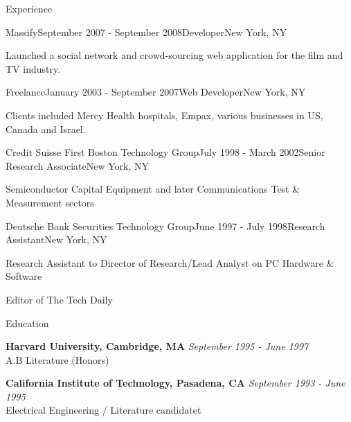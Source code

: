 \documentclass{resume} %
\begin{document}
\begin{rSection}{Experience}

\begin{rSubsection}{Massify}{September 2007 - September 2008}{Developer}{New York, NY}
\item Launched a social network and crowd-sourcing web application for the film and TV industry.
\end{rSubsection}


\begin{rSubsection}{Freelance}{January 2003 - September 2007}{Web Developer}{New York, NY}
\item Clients included Mercy Health hospitals, Empax, various businesses in US, Canada and Israel.
\end{rSubsection}


\begin{rSubsection}{Credit Suisse First Boston Technology Group}{July 1998 - March 2002}{Senior Research Associate}{New York, NY}
\item Semiconductor Capital Equipment and later Communications Test \& Measurement sectors
\end{rSubsection}


\begin{rSubsection}{Deutsche Bank Securities Technology Group}{June 1997 - July 1998}{Research Assistant}{New York, NY}
\item Research Assistant to Director of Research/Lead Analyst on PC Hardware \& Software 
\item Editor of The Tech Daily
\end{rSubsection}

\end{rSection}



\begin{rSection}{Education}

{\bf Harvard University, Cambridge, MA} \hfill {\em September 1995 - June 1997} \\ 
A.B Literature (Honors)

{\bf California Institute of Technology, Pasadena, CA} \hfill {\em September 1993 - June 1995} \\ 
Electrical Engineering / Literature candidatet\\

\end{rSection}
\end{document}
